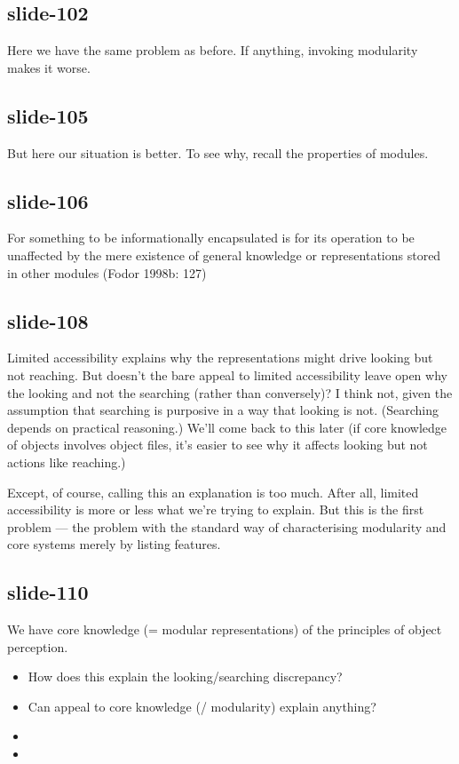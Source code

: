 \documentclass[12pt,\papersize]{extarticle}
\begin{document}
 
\subsection{slide-102}
Here we have the same problem as before. If anything, invoking modularity makes it worse.
 
 
\subsection{slide-105}
But here our situation is better. To see why, recall the properties of modules.
 
 
\subsection{slide-106}
For something to be informationally encapsulated is for its operation to be unaffected by the mere existence of general knowledge or representations stored in other modules (Fodor 1998b: 127)
 
 
\subsection{slide-108}
Limited accessibility explains why the representations might drive looking but not reaching.
But doesn't the bare appeal to limited accessibility leave open why the looking and not the searching (rather than conversely)?
I think not, given the assumption that searching is purposive in a way that looking is not. (Searching depends on practical reasoning.)
We'll come back to this later (if core knowledge of objects involves object files, it's easier to see why it affects looking but not actions like reaching.)
 
Except, of course, calling this an explanation is too much.
After all, limited accessibility is more or less what we're trying to explain.
But this is the first problem --- the problem with the standard way of characterising modularity and core systems merely by listing features.
 
 
\subsection{slide-110}
We have core knowledge (= modular representations) of the principles of object perception.
\begin{itemize} \item How does this explain the looking/searching discrepancy? \item Can appeal to core knowledge (/ modularity) explain anything? \end{itemize}
\begin{itemize}
\item
\item
\end{itemize}
 
\end{document}
